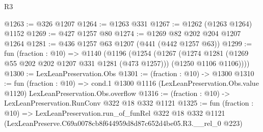 \begin{lexlean}{R3}
\begin{coremodule}
@1263 := @326 @1207
@1264 := @1263 @331
@1267 := @1262 (@1263 @1264) @1152
@1269 := @427 @1257 @80
@1274 := @1269 @82 @202 @204 @1207 @1264
@1281 := @436 @1257 @63 @1207 (@441 (@442 @1257 @63))
@1299 := fun (fraction : @10) =>
  @1140
    (@1196
      (@1254
        (@1267
          (@1274 @1281 (@1269 @55 @202 @202 @1207 @331 @1281 (@473 @1257)))
          (@1250 @1106 @1106))))
@1300 := LexLeanPreservation.Obs
@1301 := (fraction : @10) -> @1300
@1310 := fun (fraction : @10) =>
  cond.{1} @1300 @1116 (LexLeanPreservation.Obs.value @1120) LexLeanPreservation.Obs.overflow
@1316 := (fraction : @10) -> LexLeanPreservation.RunConv @322 @18 @332 @1121
@1325 := fun (fraction : @10) =>
  LexLeanPreservation.run_of_funRel
    @322
    @18
    @332
    @1121
    (LexLeanPreserve.C69a0078cb8f644959d8d87c652d4be05.R3.__rel_0 @223)
\end{coremodule}
\end{lexlean}
